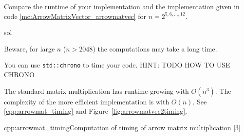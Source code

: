 \begin{samproblem}

\begin{subproblem}{}
  Compare the runtime of your implementation and the implementation given in code
  \ref{mc:ArrowMatrixVector_arrowmatvec} for $n=2^{5,6,\ldots,12}$.
 \begin{samwriteprbpart}{sol}
 \begin{samhint}
Beware, for large $n$ ($n > 2048$) the computations may take a long time.
\end{samhint}
 \begin{samhint}
  You can use \texttt{std::chrono} to time your code. HINT: TODO HOW TO USE CHRONO
 \end{samhint}
\begin{samsolution}
The standard matrix multiplication has runtime growing with $O(n^3)$.
The complexity of the more efficient implementation is with $O(n)$.
See \autoref{cpp:arrowmat_timing} and Figure~\ref{fig:arrowmatvec2timing}.

\begin{samcode}[C++11-code]{cpp:arrowmat_timing}{Computation of timing of arrow matrix multiplication}
[3]
\end{samcode}


\end{samsolution}
\end{samwriteprbpart}
\end{subproblem}

\end{samproblem}
